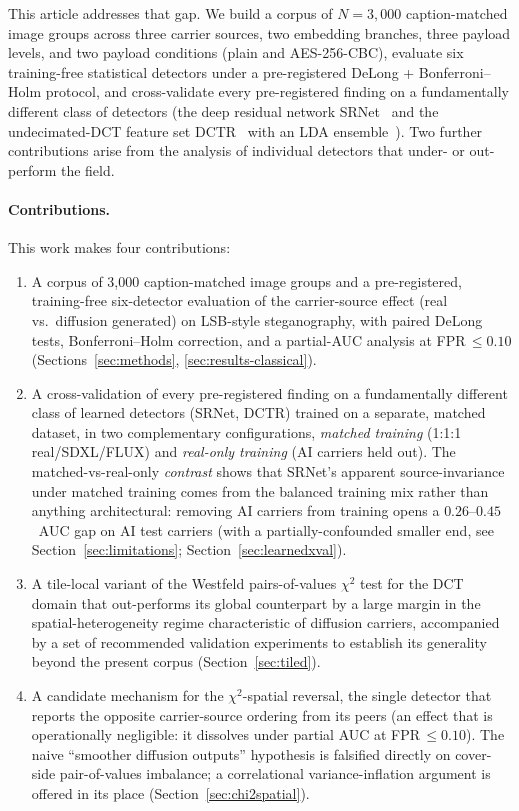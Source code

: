 \documentclass[10pt,twocolumn,a4paper]{article}
\begin{document}
This article addresses that gap. We build a corpus of $N\!=\!3{,}000$ caption-matched image groups across three carrier sources, two embedding branches, three payload levels, and two payload conditions (plain and AES-256-CBC), evaluate six training-free statistical detectors under a pre-registered DeLong + Bonferroni--Holm protocol, and cross-validate every pre-registered finding on a fundamentally different class of detectors (the deep residual network SRNet~\cite{boroumand2019srnet} and the undecimated-DCT feature set DCTR~\cite{holub2015dctr} with an LDA ensemble~\cite{fridrich2012srm}). Two further contributions arise from the analysis of individual detectors that under- or out-perform the field.

\paragraph{Contributions.} This work makes four contributions:
\begin{enumerate}
\item A corpus of 3{,}000 caption-matched image groups and a pre-registered, training-free six-detector evaluation of the carrier-source effect (real vs.\ diffusion generated) on LSB-style steganography, with paired DeLong tests, Bonferroni--Holm correction, and a partial-AUC analysis at FPR\,$\leq\!0.10$ (Sections~\ref{sec:methods}, \ref{sec:results-classical}).
\item A cross-validation of every pre-registered finding on a fundamentally different class of learned detectors (SRNet, DCTR) trained on a separate, matched dataset, in two complementary configurations, \textit{matched training} (1:1:1 real/SDXL/FLUX) and \textit{real-only training} (AI carriers held out). The matched-vs-real-only \emph{contrast} shows that SRNet's apparent source-invariance under matched training comes from the balanced training mix rather than anything architectural: removing AI carriers from training opens a $0.26$--$0.45$~AUC gap on AI test carriers (with a partially-confounded smaller end, see Section~\ref{sec:limitations}; Section~\ref{sec:learnedxval}).
\item A tile-local variant of the Westfeld pairs-of-values $\chi^2$ test for the DCT domain that out-performs its global counterpart by a large margin in the spatial-heterogeneity regime characteristic of diffusion carriers, accompanied by a set of recommended validation experiments to establish its generality beyond the present corpus (Section~\ref{sec:tiled}).
\item A candidate mechanism for the $\chi^2$-spatial reversal, the single detector that reports the opposite carrier-source ordering from its peers (an effect that is operationally negligible: it dissolves under partial AUC at FPR\,$\leq\!0.10$). The naive ``smoother diffusion outputs'' hypothesis is falsified directly on cover-side pair-of-values imbalance; a correlational variance-inflation argument is offered in its place (Section~\ref{sec:chi2spatial}).
\end{enumerate}
\end{document}
